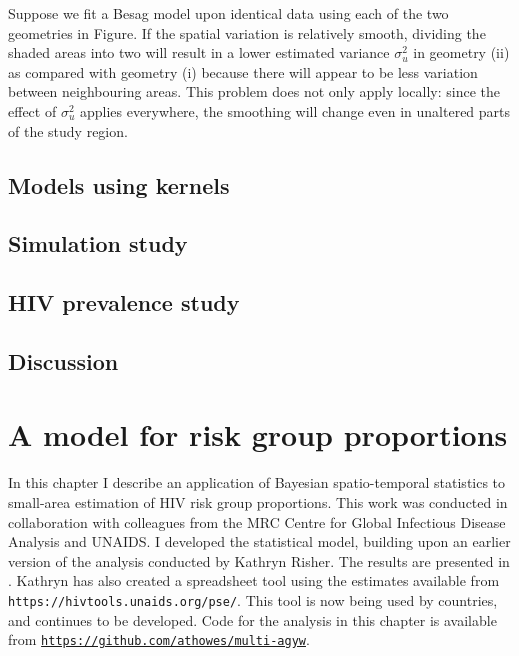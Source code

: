 \documentclass[a4paper, nobind]{templates/ociamthesis}
\begin{document}
Suppose we fit a Besag model upon identical data using each of the two geometries in Figure.
If the spatial variation is relatively smooth, dividing the shaded areas into two will result in a lower estimated variance \(\sigma^2_u\) in geometry (ii) as compared with geometry (i) because there will appear to be less variation between neighbouring areas.
This problem does not only apply locally: since the effect of \(\sigma^2_u\) applies everywhere, the smoothing will change even in unaltered parts of the study region.

\hypertarget{models-using-kernels}{%
\section{Models using kernels}\label{models-using-kernels}}

\hypertarget{simulation-study}{%
\section{Simulation study}\label{simulation-study}}

\hypertarget{hiv-prevalence-study}{%
\section{HIV prevalence study}\label{hiv-prevalence-study}}

\hypertarget{discussion}{%
\section{Discussion}\label{discussion}}

\hypertarget{multi-agyw}{%
\chapter{A model for risk group proportions}\label{multi-agyw}}

\adjustmtc
{}

In this chapter I describe an application of Bayesian spatio-temporal statistics to small-area estimation of HIV risk group proportions.
This work was conducted in collaboration with colleagues from the MRC Centre for Global Infectious Disease Analysis and UNAIDS.
I developed the statistical model, building upon an earlier version of the analysis conducted by Kathryn Risher.
The results are presented in \textcite{howes2023spatio}.
Kathryn has also created a spreadsheet tool using the estimates available from \texttt{https://hivtools.unaids.org/pse/}.
This tool is now being used by countries, and continues to be developed.
Code for the analysis in this chapter is available from \href{https://github.com/athowes/multi-agyw}{\texttt{https://github.com/athowes/multi-agyw}}.
\end{document}
